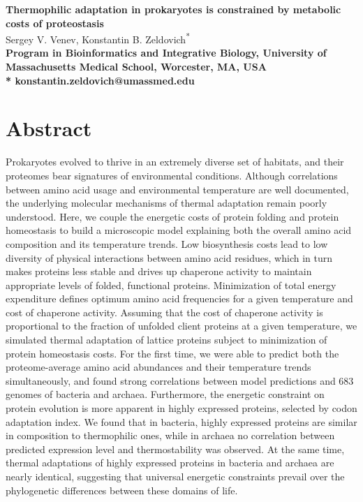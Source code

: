 \documentclass[10pt,letterpaper]{article}
\date{}
\begin{document}
\vspace*{0.35in}


\begin{flushleft}
{\Large
\textbf{Thermophilic adaptation in prokaryotes is constrained by metabolic costs of proteostasis}
}
\newline
\\
Sergey V. Venev, 
Konstantin B. Zeldovich\textsuperscript{*}
\\
\bigskip
\bf{} Program in Bioinformatics and Integrative Biology, University of Massachusetts Medical School, Worcester, MA, USA
\\
\bigskip
* konstantin.zeldovich@umassmed.edu
\end{flushleft}

\section*{Abstract}
Prokaryotes evolved to thrive in an extremely diverse set of habitats, and their proteomes bear signatures of environmental conditions. Although correlations between amino acid usage and environmental temperature are well documented, the underlying molecular mechanisms of thermal adaptation remain poorly understood.  Here, we couple the energetic costs of protein folding and protein homeostasis to build a microscopic model explaining both the overall amino acid composition and its temperature trends. Low biosynthesis costs lead to low diversity of physical interactions between amino acid residues, which in turn makes proteins less stable and drives up chaperone activity to maintain appropriate levels of folded, functional proteins.  Minimization of total energy expenditure defines optimum amino acid frequencies for a given temperature and cost of chaperone activity. Assuming that the cost of chaperone activity is proportional to the fraction of unfolded client proteins at a given temperature, we simulated thermal adaptation of lattice proteins subject to minimization of protein homeostasis costs. For the first time, we were able to predict both the proteome-average amino acid abundances and their temperature trends simultaneously, and found strong correlations between model predictions and 683 genomes of bacteria and archaea. Furthermore, the energetic constraint on protein evolution is more apparent in highly expressed proteins, selected by codon adaptation index. We found that in bacteria, highly expressed proteins are similar in composition to thermophilic ones, while in archaea no correlation between predicted expression level and thermostability was observed.
At the same time, thermal adaptations of highly expressed proteins in bacteria and archaea are nearly identical, suggesting that universal energetic constraints prevail over the phylogenetic differences between these domains of life.
\end{document}
